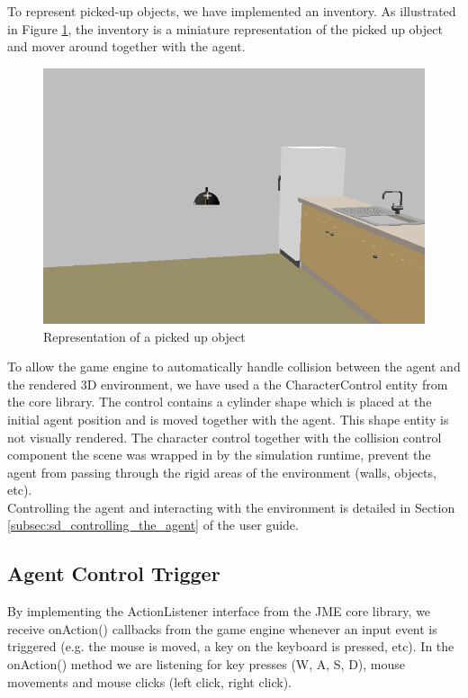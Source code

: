 To represent picked-up objects, we have implemented an inventory. As illustrated in Figure \ref{fig:impl_inventory}, the inventory is a miniature representation of the picked up object and mover around together with the agent.\\
\begin{figure}[H]
	\centering
	\includegraphics[width=0.8\linewidth]{gfx/Chapter4/inventory}
	\caption{Representation of a picked up object}
	\label{fig:impl_inventory}
\end{figure}

To allow the game engine to automatically handle collision between the agent and the rendered 3D environment, we have used a the CharacterControl entity from the core library. The control contains a cylinder shape which is placed at the initial agent position and is moved together with the agent. This shape entity is not visually rendered. The character control together with the collision control component the scene was wrapped in by the simulation runtime, prevent the agent from passing through the rigid areas of the environment (walls, objects, etc).\\

Controlling the agent and interacting with the environment is detailed in Section \ref{subsec:sd_controlling_the_agent} of the user guide.

\subsection{Agent Control Trigger} %
\label{subsec:impl_agent_control}
By implementing the ActionListener interface from the JME core library, we receive onAction() callbacks from the game engine whenever an input event is triggered (e.g. the mouse is moved, a key on the keyboard is pressed, etc). In the onAction() method we are listening for key presses (W, A, S, D), mouse movements and mouse clicks (left click, right click).\\

